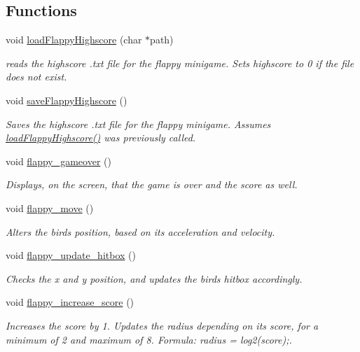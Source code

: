 \subsection*{Functions}
\begin{DoxyCompactItemize}
\item 
void \mbox{\hyperlink{group__flappy_ga48334c3029c7f0bbe6b07d3423a6702e}{load\+Flappy\+Highscore}} (char $\ast$path)
\begin{DoxyCompactList}\small\item\em reads the highscore .txt file for the flappy minigame. Sets highscore to 0 if the file does not exist. \end{DoxyCompactList}\item 
void \mbox{\hyperlink{group__flappy_ga9932d7d9d11b03bcbd7d82d8c6c36a22}{save\+Flappy\+Highscore}} ()
\begin{DoxyCompactList}\small\item\em Saves the highscore .txt file for the flappy minigame. Assumes \mbox{\hyperlink{group__flappy_ga48334c3029c7f0bbe6b07d3423a6702e}{load\+Flappy\+Highscore()}} was previously called. \end{DoxyCompactList}\item 
void \mbox{\hyperlink{group__flappy_gab4a401acb5fffbf99413000dcdff3486}{flappy\+\_\+gameover}} ()
\begin{DoxyCompactList}\small\item\em Displays, on the screen, that the game is over and the score as well. \end{DoxyCompactList}\item 
void \mbox{\hyperlink{group__flappy_ga92fa31f2712c1d2f899246a5fd5913ab}{flappy\+\_\+move}} ()
\begin{DoxyCompactList}\small\item\em Alters the bird\textquotesingle{}s position, based on its acceleration and velocity. \end{DoxyCompactList}\item 
void \mbox{\hyperlink{group__flappy_ga890241c4d6c50c4a9a15c9b3ac9d0c1a}{flappy\+\_\+update\+\_\+hitbox}} ()
\begin{DoxyCompactList}\small\item\em Checks the x and y position, and updates the bird\textquotesingle{}s hitbox accordingly. \end{DoxyCompactList}\item 
void \mbox{\hyperlink{group__flappy_gadf33bb76c8456ea822eb71ecc5325ee3}{flappy\+\_\+increase\+\_\+score}} ()
\begin{DoxyCompactList}\small\item\em Increases the score by 1. Updates the radius depending on its score, for a minimum of 2 and maximum of 8. Formula\+: radius = log2(score);. \end{DoxyCompactList}\item 

\end{DoxyCompactItemize}
